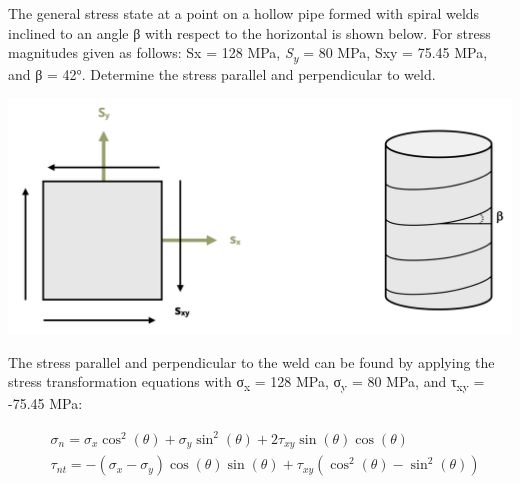 \documentclass[
  letterpaper,
  DIV=11,
  numbers=noendperiod]{scrreprt}
\theoremstyle{definition}
\theoremstyle{remark}
\begin{document}
\begin{tcolorbox}[enhanced jigsaw, leftrule=.75mm, colbacktitle=quarto-callout-tip-color!10!white, breakable, opacityback=0, colback=white, titlerule=0mm, toprule=.15mm, colframe=quarto-callout-tip-color-frame, coltitle=black, title={Example 12.1}, toptitle=1mm, bottomrule=.15mm, rightrule=.15mm, left=2mm, arc=.35mm, opacitybacktitle=0.6, bottomtitle=1mm]

The general stress state at a point on a hollow pipe formed with spiral
welds inclined to an angle β with respect to the horizontal is shown
below. For stress magnitudes given as follows: Sx = 128 MPa,
\emph{S\textsubscript{y}} = 80 MPa, Sxy = 75.45 MPa, and β = 42°.
Determine the stress parallel and perpendicular to weld.

\begin{center}
\includegraphics[width=5.40625in,height=\textheight]{images/CH12 figures/example 12.1 part 1.png}
\end{center}

\begin{tcolorbox}[enhanced jigsaw, leftrule=.75mm, colbacktitle=quarto-callout-tip-color!10!white, breakable, opacityback=0, colback=white, titlerule=0mm, toprule=.15mm, colframe=quarto-callout-tip-color-frame, coltitle=black, title={Solution}, toptitle=1mm, bottomrule=.15mm, rightrule=.15mm, left=2mm, arc=.35mm, opacitybacktitle=0.6, bottomtitle=1mm]

The stress parallel and perpendicular to the weld can be found by
applying the stress transformation equations with σ\textsubscript{x} =
128 MPa, σ\textsubscript{y} = 80 MPa, and τ\textsubscript{xy} = -75.45
MPa:

\[
\begin{aligned}
& \sigma_n=\sigma_x \cos ^2(\theta)+\sigma_y \sin ^2(\theta)+2 \tau_{x y} \sin (\theta) \cos (\theta) \\
& \tau_{n t}=-\left(\sigma_x-\sigma_y\right) \cos (\theta) \sin (\theta)+\tau_{x y}\left(\cos ^2(\theta)-\sin ^2(\theta)\right)
\end{aligned}
\]


\end{tcolorbox}
\end{tcolorbox}
\end{document}
